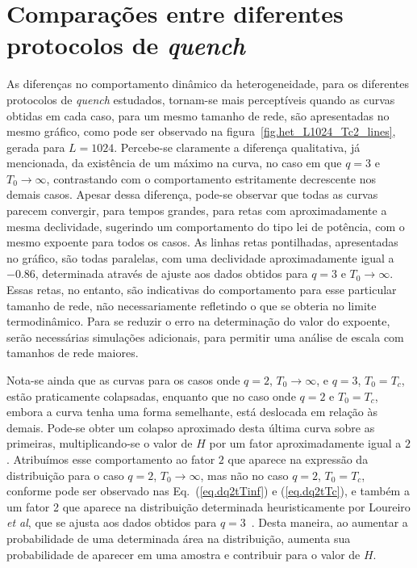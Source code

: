 \section{Comparações entre diferentes protocolos de \textit{quench}}

As diferenças no comportamento dinâmico da heterogeneidade, para os diferentes protocolos de \textit{quench} estudados, tornam-se mais perceptíveis quando as curvas obtidas em cada caso, para um mesmo tamanho de rede, são apresentadas no mesmo gráfico, como pode ser observado na figura~\ref{fig.het_L1024_Tc2_lines}, gerada para $L=1024$. Percebe-se claramente a diferença qualitativa, já mencionada, da existência de um máximo na curva, no caso em que $q=3$ e $T_0\rightarrow \infty$, contrastando com o comportamento estritamente decrescente nos demais casos. Apesar dessa diferença, pode-se observar que todas as curvas parecem convergir, para tempos grandes, para retas com aproximadamente a mesma declividade, sugerindo um comportamento do tipo lei de potência, com o mesmo expoente para todos os casos. As linhas retas pontilhadas, apresentadas no gráfico, são todas paralelas, com uma declividade aproximadamente igual a $-0.86$, determinada através de ajuste aos dados obtidos para $q=3$ e $T_0\rightarrow \infty$. Essas retas, no entanto, são indicativas do comportamento para esse particular tamanho de rede, não necessariamente refletindo o que se obteria no limite termodinâmico. Para se reduzir o erro na determinação do valor do expoente, serão necessárias simulações adicionais, para permitir uma análise de escala com tamanhos de rede maiores.

Nota-se ainda que as curvas para os casos onde $q=2$, $T_0\rightarrow \infty$, e $q=3$, $T_0=T_c$, estão praticamente colapsadas, enquanto que no caso onde $q=2$ e $T_0=T_c$, embora a curva tenha uma forma semelhante, está deslocada em relação às demais. Pode-se obter um colapso aproximado desta última curva sobre as primeiras, multiplicando-se o valor de $H$ por um fator aproximadamente igual a $2$. Atribuímos esse comportamento ao fator $2$ que aparece na expressão da distribuição para o caso $q=2$, $T_0\rightarrow \infty$, mas não no caso $q=2$, $T_0=T_c$, conforme pode ser observado nas Eq.~(\ref{eq.dq2tTinf}) e (\ref{eq.dq2tTc}), e também a um fator 2 que aparece na distribuição determinada heuristicamente por Loureiro \textit{et al}, que se ajusta aos dados obtidos para $q=3$~\cite{LoureiroPRE}. Desta maneira, ao aumentar a probabilidade de uma determinada área na distribuição, aumenta sua probabilidade de aparecer em uma amostra e contribuir para o valor de $H$.


